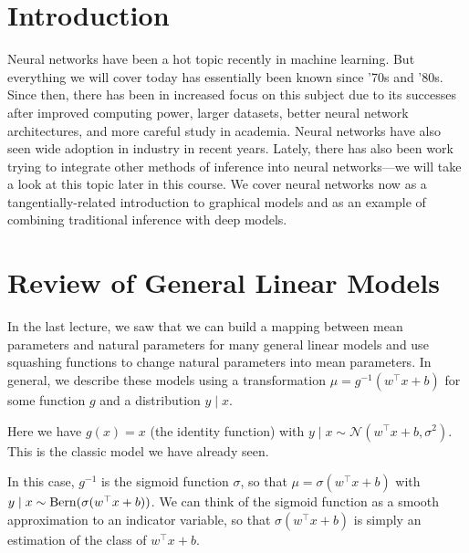 \documentclass{article}
\begin{document}

\section{Introduction}

Neural networks have been a hot topic recently in machine learning. But everything we will cover today has essentially been known since '70s and '80s. Since then, there has been in increased focus on this subject due to its successes after improved computing power, larger datasets, better neural network architectures, and more careful study in academia. Neural networks have also seen wide adoption in industry in recent years. Lately, there has also been work trying to integrate other methods of inference into neural networks---we will take a look at this topic later in this course.  We cover neural networks now as a tangentially-related introduction to graphical models and as an example of combining traditional inference with deep models.

\section{Review of General Linear Models}

In the last lecture, we saw that we can build a mapping between mean parameters and natural parameters for many general linear models and use squashing functions to change natural parameters into mean parameters.  In general, we describe these models using a transformation $\mu = g^{-1}(w^\top x+b)$ for some function $g$ and a distribution $y \mid x$.

\begin{example}
    Here we have $g(x) = x$ (the identity function) with $y \mid x \sim \mathcal{N}(w^\top x+b, \sigma^2)$.  This is the classic model we have already seen.
\end{example}

\begin{example}
    In this case, $g^{-1}$ is the sigmoid function $\sigma$, so that $\mu = \sigma(w^\top x+b)$ with $y \mid x \sim\operatorname{Bern}(\sigma(w^\top x+b))$.  We can think of the sigmoid function as a smooth approximation to an indicator variable, so that $\sigma(w^\top x+b)$ is simply an estimation of the class of $w^\top x+b$.
\end{example}
\end{document}
